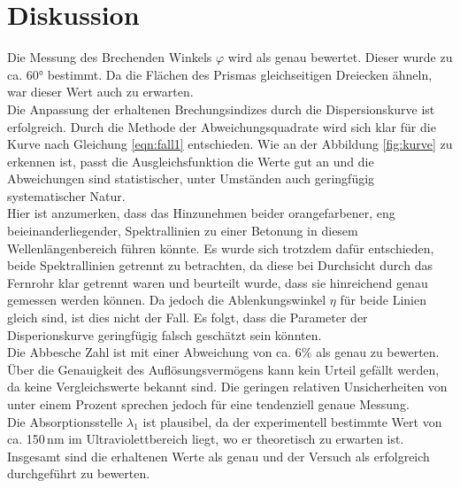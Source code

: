 \section{Diskussion}
\label{sec:Diskussion}
Die Messung des Brechenden Winkels $\varphi$ wird als genau bewertet. Dieser wurde
zu ca. 60° bestimmt. Da die Flächen des Prismas gleichseitigen Dreiecken
ähneln, war dieser Wert auch zu erwarten.\\
Die Anpassung der erhaltenen Brechungsindizes durch die Dispersionskurve ist erfolgreich.
Durch die Methode der Abweichungsquadrate wird sich klar für die Kurve nach
Gleichung \eqref{eqn:fall1} entschieden. Wie an der Abbildung \ref{fig:kurve} zu
erkennen ist, passt die Ausgleichsfunktion die Werte gut an und die Abweichungen
sind statistischer, unter Umständen auch geringfügig systematischer Natur.\\
Hier ist anzumerken, dass das Hinzunehmen beider orangefarbener, eng beieinanderliegender, Spektrallinien
zu einer Betonung in diesem Wellenlängenbereich führen könnte. Es wurde sich trotzdem
dafür entschieden, beide Spektrallinien getrennt zu betrachten, da diese bei Durchsicht
durch das Fernrohr klar getrennt waren und beurteilt wurde, dass sie hinreichend genau gemessen werden können.
Da jedoch die Ablenkungswinkel $\eta$ für beide Linien gleich sind, ist dies nicht der Fall.
Es folgt, dass die Parameter der Disperionskurve geringfügig falsch geschätzt sein könnten.\\
Die Abbesche Zahl ist mit einer Abweichung von ca. 6\% als genau zu bewerten.\\
Über die Genauigkeit des Auflösungsvermögens kann kein Urteil gefällt werden, da keine
Vergleichswerte bekannt sind. Die geringen relativen Unsicherheiten von unter einem Prozent
sprechen jedoch für eine tendenziell genaue Messung.\\
Die Absorptionsstelle $\lambda_1$ ist plausibel, da der experimentell bestimmte Wert von ca. 150\,nm im
Ultraviolettbereich liegt, wo er theoretisch zu erwarten ist.\\
Insgesamt sind die erhaltenen Werte als genau und der Versuch als erfolgreich
durchgeführt zu bewerten.
